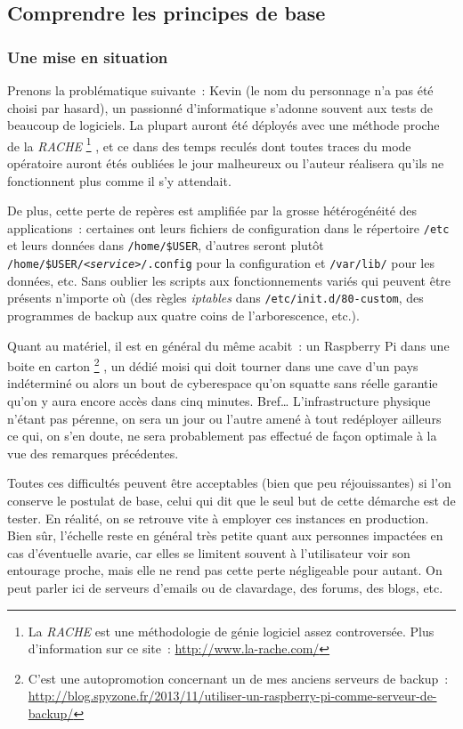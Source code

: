\subsection{Comprendre les principes de base}
\subsubsection{Une mise en situation}

Prenons la problématique suivante~:
Kevin (le nom du personnage n'a pas été choisi par hasard), un passionné d'informatique s'adonne souvent aux tests de beaucoup de logiciels.
La plupart auront été déployés avec une méthode proche de la \emph{RACHE}%
\footnote{La \emph{RACHE} est une méthodologie de génie logiciel assez controversée. Plus d'information sur ce site~: \url{http://www.la-rache.com/}}%
, et ce dans des temps reculés dont toutes traces du mode opératoire auront étés oubliées le jour malheureux ou l'auteur réalisera qu'ils ne fonctionnent plus comme il s'y attendait.

De plus, cette perte de repères est amplifiée par la grosse hétérogénéité des applications~: certaines ont leurs fichiers de configuration dans le répertoire {\tt/etc} et leurs données dans {\tt/home/\$USER}, d'autres seront plutôt {\tt/home/\$USER/\emph{<service>}/.config} pour la configuration et {\tt/var/lib/} pour les données, etc.
Sans oublier les scripts aux fonctionnements variés qui peuvent être présents n'importe où (des règles \emph{iptables} dans {\tt/etc/init.d/80-custom}, des programmes de backup aux quatre coins de l'arborescence, etc.).

Quant au matériel, il est en général du même acabit~: un Raspberry Pi dans une boite en carton%
\footnote{C'est une autopromotion concernant un de mes anciens serveurs de backup~: \url{http://blog.spyzone.fr/2013/11/utiliser-un-raspberry-pi-comme-serveur-de-backup/}}%
, un dédié moisi qui doit tourner dans une cave d'un pays indéterminé ou alors un bout de cyberespace qu'on squatte sans réelle garantie qu'on y aura encore accès dans cinq minutes.
Bref\dots{} L'infrastructure physique n'étant pas pérenne, on sera un jour ou l'autre amené à tout redéployer ailleurs ce qui, on s'en doute, ne sera probablement pas effectué de façon optimale à la vue des remarques précédentes.

Toutes ces difficultés peuvent être acceptables (bien que peu réjouissantes) si l'on conserve le postulat de base, celui qui dit que le seul but de cette démarche est de tester.
En réalité, on se retrouve vite à employer ces instances en production.
Bien sûr, l'échelle reste en général très petite quant aux personnes impactées en cas d'éventuelle avarie, car elles se limitent souvent à l'utilisateur voir son entourage proche, mais elle ne rend pas cette perte négligeable pour autant.
On peut parler ici de serveurs d'emails ou de clavardage, des forums, des blogs, etc.

